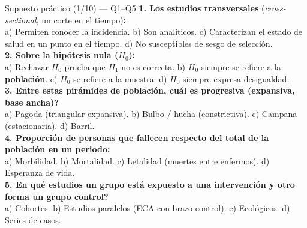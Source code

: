 \documentclass[aspectratio=169,8pt]{beamer}
\begin{document}
\begin{frame}{Supuesto pr\'actico (1/10) --- Q1--Q5}
  \scriptsize
  \textbf{1. Los estudios transversales} (\emph{cross-sectional}, un corte en el tiempo)\textbf{:}\\
  a) Permiten conocer la incidencia.\; b) Son anal\'iticos.\; c) Caracterizan el estado de salud en un punto en el tiempo.\; d) No susceptibles de sesgo de selecci\'on.\\[3pt]
  \textbf{2. Sobre la hip\'otesis nula ($H_0$):}\\
  a) Rechazar $H_0$ prueba que $H_1$ no es correcta.\; b) $H_0$ siempre se refiere a la \textbf{poblaci\'on}.\; c) $H_0$ se refiere a la muestra.\; d) $H_0$ siempre expresa desigualdad.\\[3pt]
  \textbf{3. Entre estas pir\'amides de poblaci\'on, \textquestiondown{}cu\'al es progresiva (expansiva, base ancha)?}\\
  a) Pagoda (triangular expansiva).\;
  b) Bulbo / hucha (constrictiva).\;
  c) Campana (estacionaria).\;
  d) Barril.\\[3pt]
  \textbf{4. Proporci\'on de personas que fallecen respecto del total de la poblaci\'on en un periodo:}\\
  a) Morbilidad.\; b) Mortalidad.\; c) Letalidad (muertes entre enfermos).\; d) Esperanza de vida.\\[3pt]
  \textbf{5. \textquestiondown{}En qu\'e estudios un grupo est\'a expuesto a una intervenci\'on y otro forma un grupo control?}\\
  a) Cohortes.\; b) Estudios paralelos (ECA con brazo control).\; c) Ecol\'ogicos.\; d) Series de casos.
\end{frame}
\end{document}
